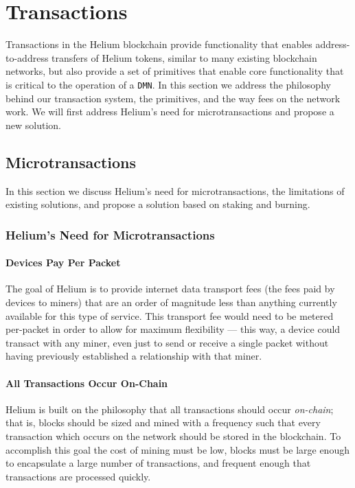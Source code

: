 \documentclass[10pt, nonatbib, nocopyrightspace, reprint]{sigplanconf}
\begin{document}
\section{Transactions}\label{transactions}

Transactions in the Helium blockchain provide functionality that enables address-to-address transfers of Helium tokens, similar to many existing blockchain networks, but also provide a set of primitives that enable core functionality that is critical to the operation of a \verb|DMN|. In this section we address the philosophy behind our transaction system, the primitives, and the way fees on the network work. We will first address Helium's need for microtransactions and propose a new solution.

\subsection{Microtransactions} \label{microtransactions}

In this section we discuss Helium's need for microtransactions, the limitations of existing solutions, and propose a solution based on staking and burning.

\subsubsection{Helium's Need for Microtransactions}

\paragraph{Devices Pay Per Packet}
The goal of Helium is to provide internet data transport fees (the fees paid by devices to miners) that are an order of magnitude less than anything currently available for this type of service. This transport fee would need to be metered per-packet in order to allow for maximum flexibility --- this way, a device could transact with any miner, even just to send or receive a single packet without having previously established a relationship with that miner.

\paragraph{All Transactions Occur On-Chain}
Helium is built on the philosophy that all transactions should occur \emph{on-chain}; that is, blocks should be sized and mined with a frequency such that every transaction which occurs on the network should be stored in the blockchain.  To accomplish this goal the cost of mining must be low, blocks must be large enough to encapsulate a large number of transactions, and frequent enough that transactions are processed quickly.
\end{document}
